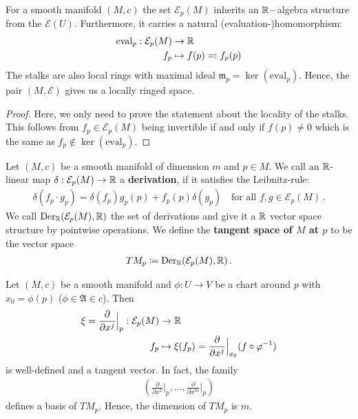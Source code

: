 \begin{corollary}
    For a smooth manifold $(M,c)$ the set $\mathcal{E}_p(M)$ inherits an $\mathbb{R}-$algebra structure from the $\mathcal{E}(U)$. Furthermore, it carries a natural (evaluation-)homomorphism:
    \begin{align*}
       \mathrm{eval}_p: \mathcal{E}_p(M) & \to \mathbb{R} \\
                    f_p  & \mapsto f(p)\eqcolon f_p(p)
    \end{align*}
    The stalks are also local rings with maximal ideal $\mathfrak{m}_p=\ker(\mathrm{eval}_p)$. Hence, the pair $(M,\mathcal{E})$ gives us a locally ringed space.
\end{corollary}
\begin{proof}
    Here, we only need to prove the statement about the locality of the stalks. This follows from $f_p\in \mathcal{E}_p(M)$ being invertible if and only if $f(p)\neq 0$ which is the same as $f_p\notin \ker(\mathrm{eval}_p)$.
\end{proof}
\begin{definition}
    Let $(M,c)$ be a smooth manifold of dimension $m$ and $p\in M$. We call an $\mathbb{R}$-linear map $\delta:\mathcal{E}_p(M)\to \mathbb{R}$ a \textbf{derivation}, if it satisfies the Leibnitz-rule:
    \begin{align*}
        \delta(f_p\cdot g_p)=\delta(f_p)g_p(p)+f_p(p)\delta(g_p) \quad \text{for all }f,g\in \mathcal{E}_p(M) \, .
    \end{align*}
    We call $\mathrm{Der}_{\mathbb{R}}(\mathcal{E}_p(M),\mathbb{R})$ the set of derivations and give it a $\mathbb{R}$ vector space structure by pointwise operations. We define the \textbf{tangent space of $M$ at $p$} to be the vector space
    \begin{align*}
        TM_p \coloneq \mathrm{Der}_{\mathbb{R}}(\mathcal{E}_p(M),\mathbb{R}) \, .
    \end{align*}
\end{definition}
\begin{corollary}
    Let $(M,c)$ be a smooth manifold and $\phi:U\to V$ be a chart around $p$ with $x_0=\phi(p)$ ($\phi \in \mathfrak{A}\in c$). Then 
    \begin{align*}
        \xi=\frac{\partial}{\partial x^j}\Big|_p : \mathcal{E}_p(M) &\to \mathbb{R} \\
        f_p & \mapsto \xi(f_p)=\frac{\partial}{\partial x^j}\Big|_{x_0}(f\circ \varphi^{-1} )
    \end{align*} is well-defined and a tangent vector. In fact, the family
    \begin{align*}
        \left(\frac{\partial}{\partial x^1}\Big|_p,...,\frac{\partial}{\partial x^m}\Big|_p\right)
    \end{align*} defines a basis of $TM_p$. Hence, the dimension of $TM_p$ is $m$.
\end{corollary}
